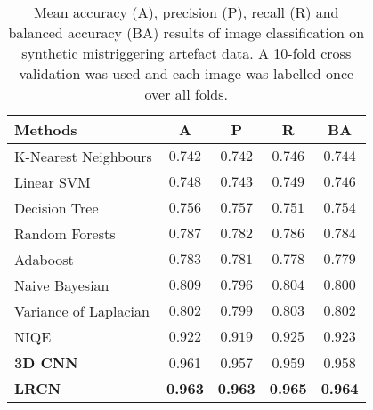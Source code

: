 \documentclass[preprint,12pt,authoryear]{elsarticle}
\begin{document}
\begin{table} 
\centering
\caption{Mean accuracy (A), precision (P), recall (R) and balanced accuracy (BA) results of image classification on synthetic mistriggering artefact data. A 10-fold cross validation was used and each image was labelled once over all folds.}
\begin{tabular}{lcccc}
\hline
Methods    & A & P & R  & BA\\
\hline 

K-Nearest Neighbours  & $0.742$  & $0.742$  & $0.746$    & $0.744$     \\
Linear SVM    & $ 0.748 $  & $0.743$  & $0.749$  & $0.746$   \\
Decision Tree   &   $ 0.756 $  & $0.757$  & $0.751$  & $0.754$   \\
Random Forests   & $0.787$    & $0.782$  & $0.786$   & $0.784$  \\
Adaboost   & $0.783 $  & $0.781$  & $0.778$       & $0.779$   \\
Naive Bayesian   & $0.809$  & $0.796$  & $0.804$    & $0.800$     \\
Variance of Laplacian  & $0.802$  & $0.799$ & $0.803$   & $0.802$   \\
NIQE \citep{Mittal2013}  & $0.922$  & $0.919 $& $0.925$  & $0.923$     \\
\hline
\textbf{3D CNN }    & 0.961 & 0.957 & 0.959  & 0.958     \\
\textbf{LRCN }   & \textbf{0.963} &  \textbf{0.963} & \textbf{0.965} &  \textbf{0.964}  \\


\hline
\end{tabular}
\label{table:synmis}
\end{table}


\end{document}
